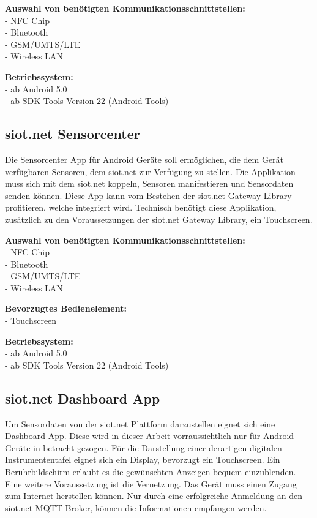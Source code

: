 \textbf{Auswahl von benötigten Kommunikationsschnittstellen:}\\
- NFC Chip\\
- Bluetooth\\
- GSM/UMTS/LTE\\
- Wireless LAN

\textbf{Betriebssystem:}\\
- ab Android 5.0\\
- ab SDK Tools Version 22 (Android Tools)

\subsection{siot.net Sensorcenter}
Die Sensorcenter App für Android Geräte soll ermöglichen, die dem Gerät verfügbaren Sensoren, dem siot.net zur Verfügung zu stellen. Die Applikation muss sich mit dem siot.net koppeln, Sensoren manifestieren und Sensordaten senden können. Diese App kann vom Bestehen der siot.net Gateway Library profitieren, welche integriert wird. Technisch benötigt diese Applikation, zusätzlich zu den Voraussetzungen der siot.net Gateway Library, ein Touchscreen.

\textbf{Auswahl von benötigten Kommunikationsschnittstellen:}\\
- NFC Chip\\
- Bluetooth\\
- GSM/UMTS/LTE\\
- Wireless LAN

\textbf{Bevorzugtes Bedienelement:}\\
- Touchscreen

\textbf{Betriebssystem:}\\
- ab Android 5.0\\
- ab SDK Tools Version 22 (Android Tools)

\subsection{siot.net Dashboard App}
Um Sensordaten von der siot.net Plattform darzustellen eignet sich eine Dashboard App. Diese wird in dieser Arbeit vorraussichtlich nur für Android Geräte in betracht gezogen. Für die Darstellung einer derartigen digitalen Instrumententafel eignet sich ein Display, bevorzugt ein Touchscreen. Ein Berührbildschirm erlaubt es die gewünschten Anzeigen bequem einzublenden. Eine weitere Voraussetzung ist die Vernetzung. Das Gerät muss einen Zugang zum Internet herstellen können. Nur durch eine erfolgreiche Anmeldung an den siot.net MQTT Broker, können die Informationen empfangen werden.

